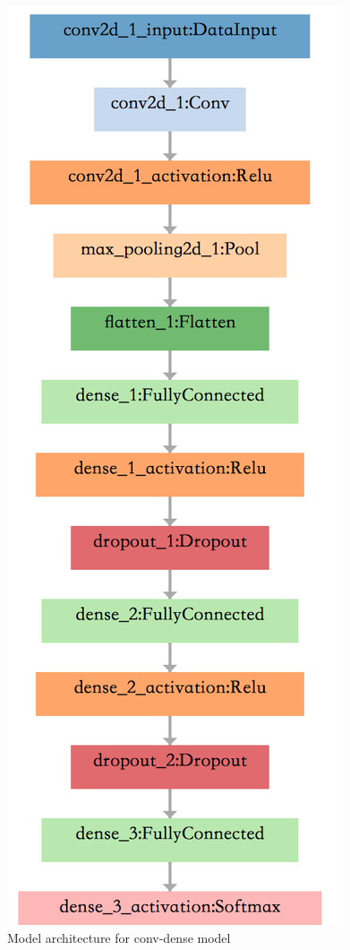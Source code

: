 \documentclass{article}
\begin{document}
\begin{figure}[htbp]
    \centering
    \includegraphics[scale = 0.5]{model2.png}
    \caption{Model architecture for conv-dense model}
    \label{fig7}
\end{figure}
\end{document}
